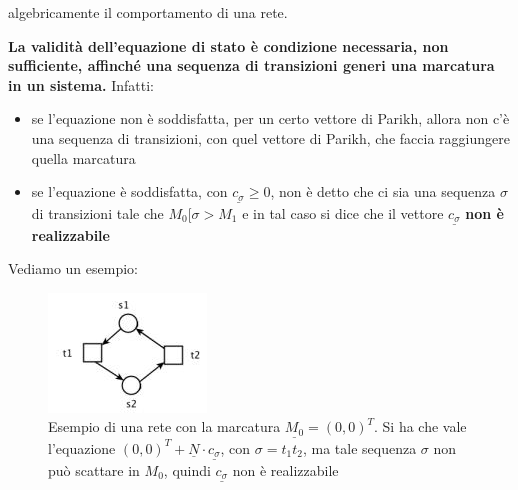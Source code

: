 \documentclass[a4paper,12pt, oneside]{book}
\begin{document}
\begin{definizione}
\begin{esempio}
    algebricamente il comportamento di una rete.
  \end{esempio}
  \textbf{La validità dell’equazione di stato è condizione necessaria, non
    sufficiente, affinché una sequenza di transizioni generi una marcatura in un
    sistema.} Infatti:
  \begin{itemize}
    \item se l’equazione non è soddisfatta, per un certo vettore di Parikh,
    allora non c’è una sequenza di transizioni, con quel vettore di Parikh, che
    faccia raggiungere quella marcatura
    \item se l’equazione è soddisfatta, con $\underline{c_\sigma}\geq 0$, non è
    detto che ci sia una sequenza $\sigma$ di transizioni tale che $M_0 [\sigma
    > M_1$ e in tal caso si dice che il vettore $\underline{c_\sigma}$
    \textbf{non è realizzabile}
  \end{itemize}
  \begin{esempio}
    Vediamo un esempio:
    \begin{figure}[H]
      \centering
      \includegraphics[scale = 0.6]{img/al7.jpg}
      \caption{Esempio di una rete con la marcatura
        $\underline{M_0}=(0,0)^T$. Si ha che vale l'equazione
        $(0,0)^T+\underline{N}\cdot \underline{c_\sigma}$, con $\sigma =t_1t_2$,
        ma tale sequenza $\sigma$ non può scattare in $M_0$, quindi
        $\underline{c_\sigma}$ non è realizzabile}
    \end{figure}
  \end{esempio}
\end{definizione}
\end{document}
